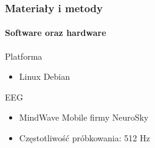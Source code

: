 \documentclass{beamer}
\begin{document}
\begin{frame}
\begin{columns}
\begin{column}{0.5\textwidth}
        \end{column}
        \begin{column}{0.5\textwidth}
        \end{column}
    \end{columns}
\end{frame}

\begin{frame}	
    \frametitle{Materiały i metody}
    \framesubtitle{Software oraz hardware}
    \pause
    \begin{block}{Platforma}
        \pause
        \begin{itemize} [<+->]
            \item Linux Debian
        \end{itemize}
    \end{block}
    \begin{block}{EEG}
        \pause
        \begin{itemize} [<+->]
            \item MindWave Mobile firmy NeuroSky
            \item Częstotliwość próbkowania: 512 Hz
        \end{itemize}
    \end{block}
\end{frame}
\end{document}

